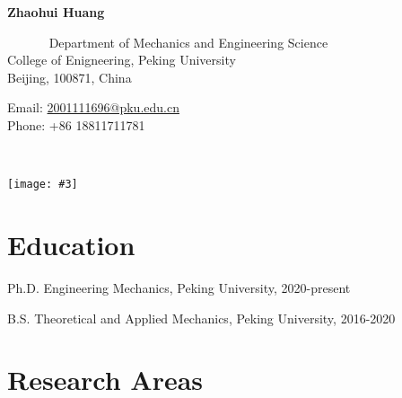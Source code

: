 \documentclass[12pt,letterpaper]{report}
\newcommand{\headingphoto}[3]{
	\begin{minipage}[t]{0.60\textwidth}
		\begin{dummyenv}
			\vspace*{\fill}
			\Huge \textcolor{color-title}{#1}
		\end{dummyenv}
		\vspace{5mm}\\
		#2
	\end{minipage}
	\begin{minipage}[t]{0.35\textwidth}
		\begin{flushright}
			\texttt{[image: \#3]}
		\end{flushright}
	\end{minipage}
}
\newcommand{\myname}{Zhaohui Huang}
\newcommand{\namefont}[1]{{\normalfont\bfseries\Huge{#1}}}
\begin{document}
    \raggedright{}

    \namefont{\myname}
    

    \vspace{1em}
    \begin{minipage}[t]{0.700\textwidth}
        \
        \newline
        \
        \newline
        \
        \newline
        \
        \newline
        Department of Mechanics and Engineering Science \\
        College of Enigneering, Peking University \\
        Beijing, 100871, China
        \
        \newline
        
        Email: \href{mailto:2001111696@pku.edu.cn}{2001111696@pku.edu.cn} \\
        Phone: +86 18811711781
        
    \end{minipage}
    \begin{minipage}[t]{0.295\textwidth}
        \headingphoto{}{
        }{photo1.jpg}
        \flushright{}
    \end{minipage}


    \section*{Education}

    \begin{tablist}

        \item[Ph.D.] \tab{}Engineering Mechanics, Peking University, 2020-present
        \item[B.S.]  \tab{}Theoretical and Applied Mechanics, Peking University, 2016-2020

    \end{tablist}

    \section*{Research Areas}
\end{document}
